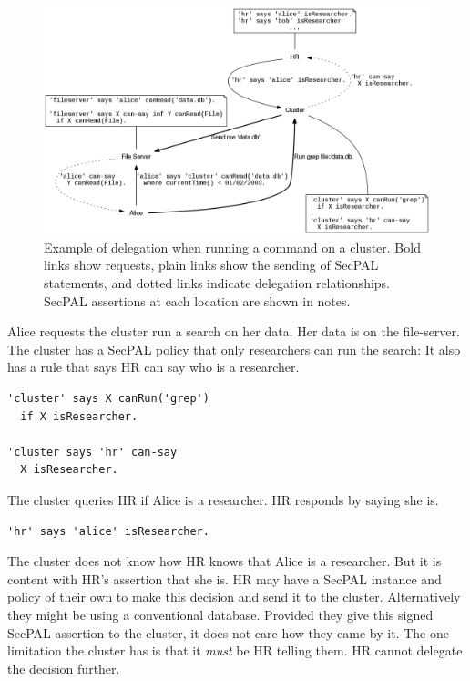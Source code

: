 \documentclass[thesis.tex]{subfiles}
\begin{document}
\begin{figure}
  \centering
  \includegraphics[width=\textwidth]{figures/secpal-example.png}
  \caption[Example of delegation on a cluster.]{Example of delegation when running a command on a cluster.  Bold links show requests, plain links show the sending of SecPAL statements, and dotted links indicate delegation relationships.  SecPAL assertions at each location are shown in notes.}
  \label{fig:delegation-example}
\end{figure}

Alice requests the cluster run a search on her data.  Her data is on the file-server.
The cluster has a SecPAL policy that only researchers can run the search:
It also has a rule that says HR can say who is a researcher.
\begin{lstlisting}
'cluster' says X canRun('grep')
  if X isResearcher.

'cluster says 'hr' can-say
  X isResearcher.
\end{lstlisting}
The cluster queries HR if Alice is a researcher. HR responds by saying she is.
\begin{lstlisting}
'hr' says 'alice' isResearcher.
\end{lstlisting}
The cluster does not know how HR knows that Alice is a researcher. But it
is content with HR's assertion that she is.  HR may have a SecPAL
instance and policy of their own to make this decision and send it to the
cluster. Alternatively they might be using a conventional database.  Provided
they give this signed SecPAL assertion to the cluster, it does not care
how they came by it.  The one limitation the cluster has is that it
\emph{must} be HR telling them. HR cannot delegate the decision
further.
\end{document}
